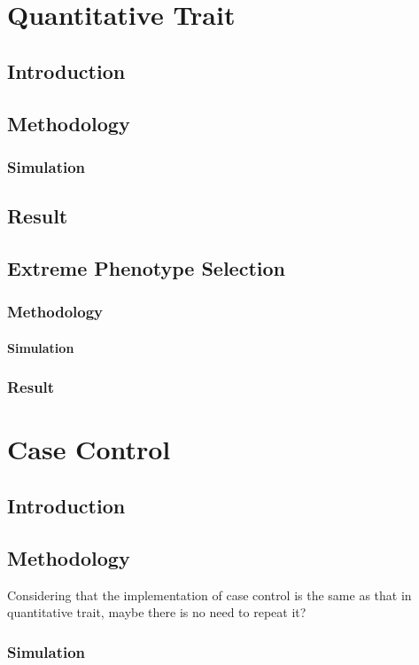 \documentclass{book}
\begin{document}
	\chapter{Quantitative Trait}
	\section{Introduction}
	\section{Methodology}
	\subsection{Simulation}
	\section{Result}
	
	\section{Extreme Phenotype Selection}
	\subsection{Methodology}
	\subsubsection{Simulation}
	\subsection{Result}
	
	\chapter{Case Control}
	\section{Introduction}
	\section{Methodology}
	Considering that the implementation of case control is the same as that in quantitative trait, maybe there is no need to repeat it?
	\subsection{Simulation}
\end{document}
